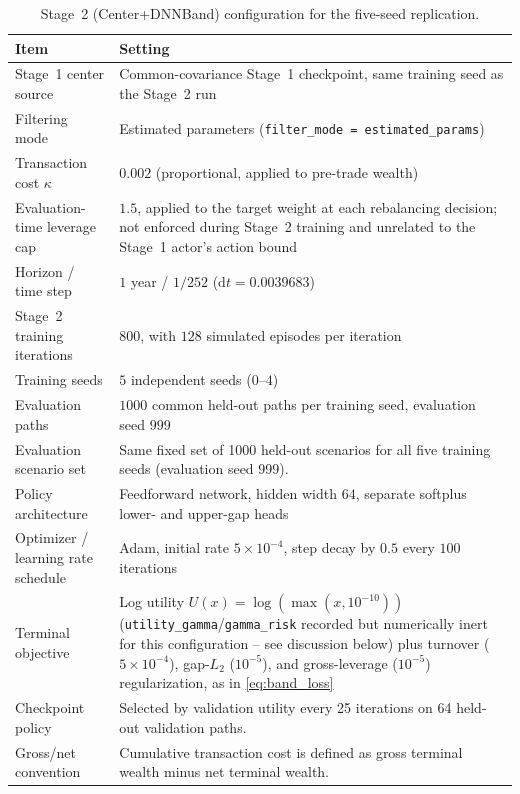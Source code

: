 \documentclass[a4paper,10pt]{article}
\begin{document}
\begin{table}[H]
\centering
\small
\caption{Stage~2 (Center+DNNBand) configuration for the five-seed replication.}
\label{tab:stage2_config}
\begin{tabular}{>{\raggedright\arraybackslash}p{} >{\raggedright\arraybackslash}p{}}
\toprule
Item & Setting \\
\midrule
Stage~1 center source & Common-covariance Stage~1 checkpoint, same training seed as the Stage~2 run \\
Filtering mode & Estimated parameters (\texttt{filter\_mode = estimated\_params}) \\
Transaction cost $\kappa$ & $0.002$ (proportional, applied to pre-trade wealth) \\
Evaluation-time leverage cap & $1.5$, applied to the target weight at each rebalancing decision; not enforced during Stage~2 training and unrelated to the Stage~1 actor's action bound \\
Horizon / time step & $1$ year / $1/252$ ($\mathrm{d}t=0.0039683$) \\
Stage~2 training iterations & $800$, with $128$ simulated episodes per iteration \\
Training seeds & $5$ independent seeds ($0$--$4$) \\
Evaluation paths & $1000$ common held-out paths per training seed, evaluation seed $999$ \\
Evaluation scenario set & Same fixed set of 1000 held-out scenarios for all five training seeds (evaluation seed 999). \\
Policy architecture & Feedforward network, hidden width $64$, separate softplus lower- and upper-gap heads \\
Optimizer / learning rate schedule & Adam, initial rate $5\times 10^{-4}$, step decay by $0.5$ every $100$ iterations \\
Terminal objective & Log utility $U(x)=\log(\max(x,10^{-10}))$ (\texttt{utility\_gamma}/\texttt{gamma\_risk} recorded but numerically inert for this configuration -- see discussion below) plus turnover ($5\times10^{-4}$), gap-$L_2$ ($10^{-5}$), and gross-leverage ($10^{-5}$) regularization, as in \eqref{eq:band_loss} \\
Checkpoint policy & Selected by validation utility every 25 iterations on 64 held-out validation paths. \\
Gross/net convention & Cumulative transaction cost is defined as gross terminal wealth minus net terminal wealth. \\
\bottomrule
\end{tabular}
\end{table}
\end{document}
